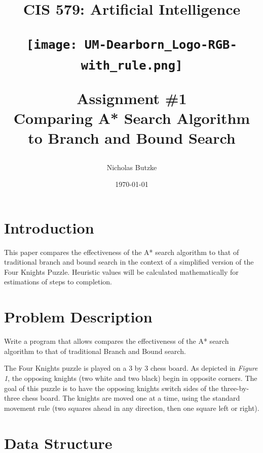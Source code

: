 \documentclass[12pt, letterpaper, final, onecolumn, titlepage] {article}
\title{CIS 579: Artificial Intelligence \\
	\vspace{1.5cm}
   		\begin{center}\texttt{[image: UM-Dearborn\_Logo-RGB-with\_rule.png]} \end{center}
	\vspace{1.5cm}
	\textbf{Assignment \#1} \\
Comparing A* Search Algorithm to Branch and Bound Search}
\author{Nicholas Butzke}
\date{\today}
\begin{document}
\maketitle

\doublespacing

\section{Introduction}

This paper compares the effectiveness of the A* search algorithm to that of traditional branch and bound search in the context of a simplified version of the Four Knights Puzzle.  Heuristic values will be calculated mathematically for estimations of steps to completion.

\section{Problem Description}

Write a program that allows compares the effectiveness of the A* search algorithm to that of traditional Branch and Bound search. 
\vspace{0.5cm}

\begin{minipage}{\linewidth} %
\end{minipage}

\vspace{0.5cm}
\noindent The Four Knights puzzle is played on a 3 by 3 chess board. As depicted in \textit{Figure 1}, the opposing knights (two white and two black) begin in opposite corners. The goal of this puzzle is to have the opposing knights switch sides of the three-by-three chess board. The knights are moved one at a time, using the standard movement rule (two squares ahead in any direction, then one square left or right).
\newpage
\section{Data Structure}
\end{document}
